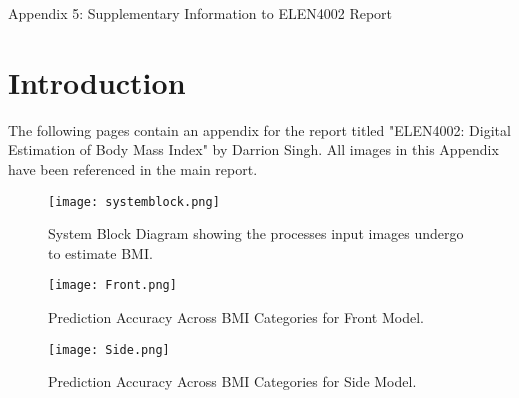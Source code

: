 \documentclass[conference]{IEEEtran}
\begin{document}
\onecolumn
\begin{center}
\LARGE Appendix 5: Supplementary Information to ELEN4002 Report
\end{center}
\section{Introduction}
The following pages contain an appendix for the report titled "ELEN4002: Digital Estimation of Body Mass Index" by Darrion Singh.
All images in this Appendix have been referenced in the main report.
\begin{figure}[h]
    \centering
    \texttt{[image: systemblock.png]}
    \caption{System Block Diagram showing the processes input images undergo to estimate BMI.}
    \label{fig:systemblockdiagram}
\end{figure}

\begin{figure}[h]
    \centering
    \begin{minipage}[b]{0.3\textwidth}
    \texttt{[image: Front.png]}
    \caption{Prediction Accuracy Across BMI Categories for Front Model.}
    \label{fig:frontaccuracy}
    \end{minipage}
    \hspace{1cm}
    \begin{minipage}[b]{0.3\textwidth}
    \texttt{[image: Side.png]}
    \caption{Prediction Accuracy Across BMI Categories for Side Model.}
    \label{fig:sideaccuracy}
    \end{minipage}
\end{figure}

\end{document}
